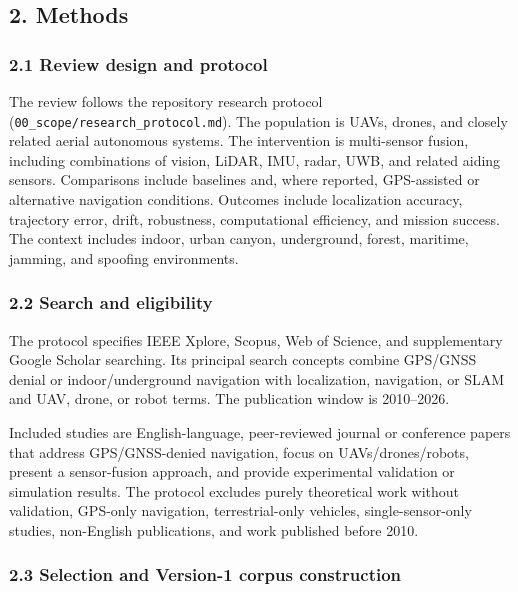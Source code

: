 \documentclass[
  journal]{IEEEtran}
\begin{document}
\subsection{2. Methods}\label{2-methods}

\subsubsection{2.1 Review design and
protocol}\label{21-review-design-and-protocol}

The review follows the repository research protocol
(\texttt{00\_scope/research\_protocol.md}). The population is UAVs,
drones, and closely related aerial autonomous systems. The intervention
is multi-sensor fusion, including combinations of vision, LiDAR, IMU,
radar, UWB, and related aiding sensors. Comparisons include baselines
and, where reported, GPS-assisted or alternative navigation conditions.
Outcomes include localization accuracy, trajectory error, drift,
robustness, computational efficiency, and mission success. The context
includes indoor, urban canyon, underground, forest, maritime, jamming,
and spoofing environments.

\subsubsection{2.2 Search and
eligibility}\label{22-search-and-eligibility}

The protocol specifies IEEE Xplore, Scopus, Web of Science, and
supplementary Google Scholar searching. Its principal search concepts
combine GPS/GNSS denial or indoor/underground navigation with
localization, navigation, or SLAM and UAV, drone, or robot terms. The
publication window is 2010--2026.

Included studies are English-language, peer-reviewed journal or
conference papers that address GPS/GNSS-denied navigation, focus on
UAVs/drones/robots, present a sensor-fusion approach, and provide
experimental validation or simulation results. The protocol excludes
purely theoretical work without validation, GPS-only navigation,
terrestrial-only vehicles, single-sensor-only studies, non-English
publications, and work published before 2010.

\subsubsection{2.3 Selection and Version-1 corpus
construction}\label{23-selection-and-version-1-corpus-construction}
\end{document}
